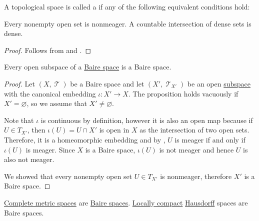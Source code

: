 \begin{definition}\label{def:baire_space}
  A topological space is called a  if any of the following equivalent conditions hold:
  \begin{thmenum}
     Every nonempty open set is nonmeager.
     A countable intersection of dense sets is dense.
  \end{thmenum}
\end{definition}
\begin{proof}
   Follows from  and .
\end{proof}

\begin{proposition}\label{thm:open_subspace_of_baire_space_is_baire}
  Every open subspace of a \hyperref[def:baire_space]{Baire space} is a Baire space.
\end{proposition}
\begin{proof}
  Let \( (X, \mscrT) \) be a Baire space and let \( (X', \mscrT_{X'}) \) be an open \hyperref[def:topological_subspace]{subspace} with the canonical embedding \( \iota: X' \to X \). The proposition holds vacuously if \( X' = \varnothing \), so we assume that \( X' \neq \varnothing \).

  Note that \( \iota \) is continuous by definition, however it is also an open map because if \( U \in T_{X'} \), then \( \iota(U) = U \cap X' \) is open in \( X \) as the intersection of two open sets. Therefore, it is a homeomorphic embedding and by , \( U \) is meager if and only if \( \iota(U) \) is meager. Since \( X \) is a Baire space, \( \iota(U) \) is not meager and hence \( U \) is also not meager.

  We showed that every nonempty open set \( U \in T_{X'} \) is nonmeager, therefore \( X' \) is a Baire space.
\end{proof}

\begin{theorem}\label{thm:baire_category_theorem}
  \begin{thmenum}
     \hyperref[def:complete_metric_space]{Complete metric spaces} are \hyperref[def:baire_space]{Baire spaces}.
     \hyperref[def:locally_compact_space]{Locally compact} \hyperref[def:separation_axioms/T2]{Hausdorff} spaces are Baire spaces.
  \end{thmenum}
\end{theorem}
